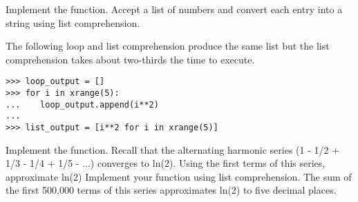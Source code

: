 \begin{problem}
Implement the  function.
Accept a list of numbers and convert each entry into a string using list comprehension.
\end{problem}

The following  loop and list comprehension produce the same list but the list comprehension takes about two-thirds the time to execute.

\begin{lstlisting}
>>> loop_output = []
>>> for i in xrange(5):
...    loop_output.append(i**2)
...
>>> list_output = [i**2 for i in xrange(5)]
\end{lstlisting}

\begin{problem}
Implement the  function.
Recall that the alternating harmonic series (1 - 1/2 + 1/3 - 1/4 + 1/5 - ...) converges to ln(2).
Using the first  terms of this series, approximate ln(2)
Implement your function using list comprehension.
The sum of the first 500,000 terms of this series approximates ln(2) to five decimal places.
\end{problem}
